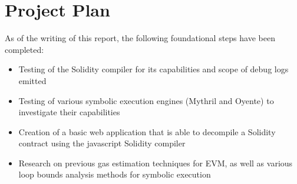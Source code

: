 \chapter{Project Plan}
\label{chap:projplan}

As of the writing of this report, the following foundational steps have been
completed:
\begin{itemize}
  \item Testing of the Solidity compiler for its capabilities and scope of debug logs emitted
  \item Testing of various symbolic execution engines (Mythril and Oyente) to investigate their capabilities
  \item Creation of a basic web application that is able to decompile a Solidity contract using the javascript Solidity compiler
  \item Research on previous gas estimation techniques for EVM, as well as various loop bounds analysis methods for symbolic execution
\end{itemize}

